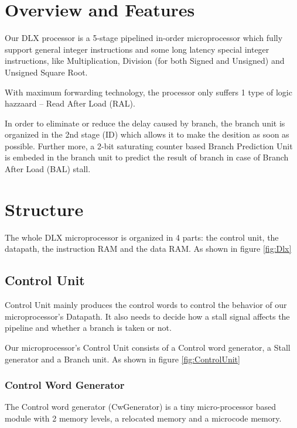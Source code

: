 

\chapter[Overview and Features]{Overview and Features}
Our DLX processor is a 5-stage pipelined in-order microprocessor which fully support
general integer instructions and some long latency special integer instructions,
like Multiplication, Division (for both Signed and Unsigned) and Unsigned Square Root.

With maximum forwarding technology, the processor only suffers 1 type of logic hazzaard -- 
Read After Load (RAL).

In order to eliminate or reduce the delay caused by branch, the branch unit is organized
in the 2nd stage (ID) which allows it to make the desition as soon as possible.
Further more, a 2-bit saturating counter based Branch Prediction Unit is embeded in the branch unit to
predict the result of branch in case of Branch After Load (BAL) stall.

\chapter[Structure]{Structure}
The whole DLX microprocessor is organized in 4 parts: the control unit, the datapath,
the instruction RAM and the data RAM. As shown in figure \ref{fig:Dlx}

\section[Control Unit]{Control Unit}
Control Unit mainly produces the control words to control the behavior of our microprocessor's Datapath.
It also needs to decide how a stall signal affects the pipeline and whether a branch
is taken or not.

Our microprocessor's Control Unit consists of a Control word generator, a Stall generator and a Branch unit.
As shown in figure \ref{fig:ControlUnit}

\subsection[Control Word Generator]{Control Word Generator}
The Control word generator (CwGenerator) is a tiny micro-processor based module with 2 memory levels,
a relocated memory and a microcode memory.

